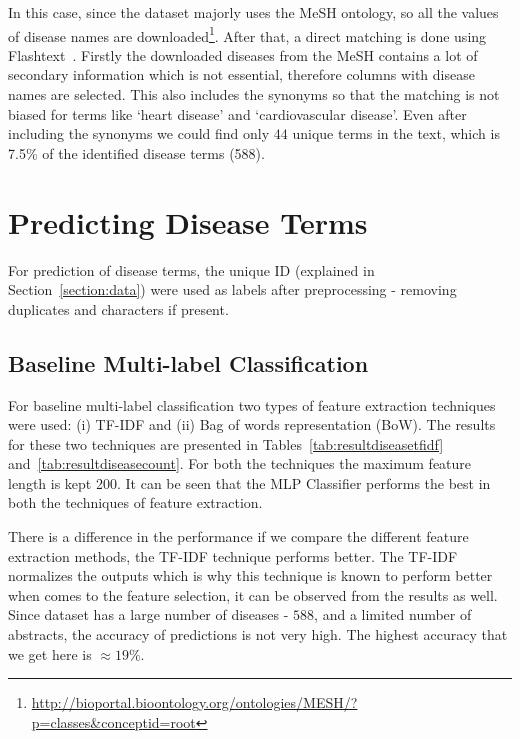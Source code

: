 In this case, since the dataset majorly uses the MeSH ontology, so all the values of disease names are downloaded\footnote{\url{http://bioportal.bioontology.org/ontologies/MESH/?p=classes&conceptid=root}}. After that, a direct matching is done using Flashtext~\cite{2017arXiv171100046S}. Firstly the downloaded diseases from the MeSH contains a lot of secondary information which is not essential, therefore columns with disease names are selected. This also includes the synonyms so that the matching is not biased for terms like `heart disease' and `cardiovascular disease'. Even after including the synonyms we could find only $44$ unique terms in the text, which is 7.5\% of the identified disease terms (588).



\section{Predicting Disease Terms}
For prediction of disease terms, the unique ID (explained in Section~\ref{section:data}) were used as labels after preprocessing - removing duplicates and characters if present. 

\subsection{Baseline Multi-label Classification}
For baseline multi-label classification two types of feature extraction techniques were used: (i) TF-IDF and (ii) Bag of words representation (BoW). The results for these two techniques are presented in Tables~\ref{tab:resultdiseasetfidf} and~\ref{tab:resultdiseasecount}. For both the techniques the maximum feature length is kept 200. It can be seen that the MLP Classifier performs the best in both the techniques of feature extraction. 

There is a difference in the performance if we compare the different feature extraction methods, the TF-IDF technique performs better. The TF-IDF normalizes the outputs which is why this technique is known to perform better when comes to the feature selection, it can be observed from the results as well. 
Since dataset has a large number of diseases - $588$, and a limited number of abstracts, the accuracy of predictions is not very high. The highest accuracy that we get here is $\approx 19\%$. 

